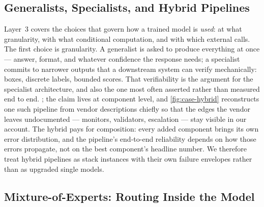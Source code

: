 
\subsection{Generalists, Specialists, and Hybrid Pipelines}
\label{sec:l3-mix}

Layer~3 covers the choices that govern how a trained model is \emph{used}: at what granularity, with what conditional computation, and with which external calls. The first choice is granularity. A generalist is asked to produce everything at once --- answer, format, and whatever confidence the response needs; a specialist commits to narrower outputs that a downstream system can verify mechanically: boxes, discrete labels, bounded scores. That verifiability is the argument for the specialist architecture, and also the one most often asserted rather than measured end to end. ; the claim lives at component level, and \cref{fig:case-hybrid} reconstructs one such pipeline from vendor descriptions chiefly so that the edges the vendor leaves undocumented --- monitors, validators, escalation --- stay visible in our account. The hybrid pays for composition: every added component brings its own error distribution, and the pipeline's end-to-end reliability depends on how those errors propagate, not on the best component's headline number. We therefore treat hybrid pipelines as stack instances with their own failure envelopes rather than as upgraded single models.

\subsection{Mixture-of-Experts: Routing Inside the Model}
\label{sec:l3-moe}

